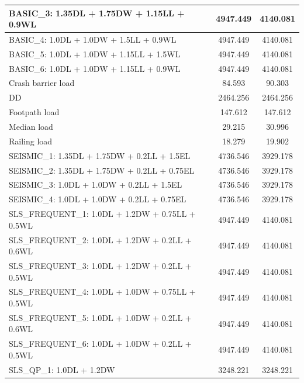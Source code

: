 \documentclass[12pt,a4paper]{report}
\newlength{\usablew}
\numberwithin{table}{chapter}
\numberwithin{figure}{chapter}
\begin{document}
\begin{longtable}{|L{\usablew\relax}|C{\usablew\relax}|C{\usablew\relax}|}
\hline
BASIC\_\allowbreak{}3:\allowbreak{} 1.35DL + 1.75DW + 1.15LL + 0.9WL & 4947.449 & 4140.081 \\
\hline
BASIC\_\allowbreak{}4:\allowbreak{} 1.0DL + 1.0DW + 1.5LL + 0.9WL & 4947.449 & 4140.081 \\
\hline
BASIC\_\allowbreak{}5:\allowbreak{} 1.0DL + 1.0DW + 1.15LL + 1.5WL & 4947.449 & 4140.081 \\
\hline
BASIC\_\allowbreak{}6:\allowbreak{} 1.0DL + 1.0DW + 1.15LL + 0.9WL & 4947.449 & 4140.081 \\
\hline
Crash barrier load & 84.593 & 90.303 \\
\hline
DD & 2464.256 & 2464.256 \\
\hline
Footpath load & 147.612 & 147.612 \\
\hline
Median load & 29.215 & 30.996 \\
\hline
Railing load & 18.279 & 19.902 \\
\hline
SEISMIC\_\allowbreak{}1:\allowbreak{} 1.35DL + 1.75DW + 0.2LL + 1.5EL & 4736.546 & 3929.178 \\
\hline
SEISMIC\_\allowbreak{}2:\allowbreak{} 1.35DL + 1.75DW + 0.2LL + 0.75EL & 4736.546 & 3929.178 \\
\hline
SEISMIC\_\allowbreak{}3:\allowbreak{} 1.0DL + 1.0DW + 0.2LL + 1.5EL & 4736.546 & 3929.178 \\
\hline
SEISMIC\_\allowbreak{}4:\allowbreak{} 1.0DL + 1.0DW + 0.2LL + 0.75EL & 4736.546 & 3929.178 \\
\hline
SLS\_\allowbreak{}FREQUENT\_\allowbreak{}1:\allowbreak{} 1.0DL + 1.2DW + 0.75LL + 0.5WL & 4947.449 & 4140.081 \\
\hline
SLS\_\allowbreak{}FREQUENT\_\allowbreak{}2:\allowbreak{} 1.0DL + 1.2DW + 0.2LL + 0.6WL & 4947.449 & 4140.081 \\
\hline
SLS\_\allowbreak{}FREQUENT\_\allowbreak{}3:\allowbreak{} 1.0DL + 1.2DW + 0.2LL + 0.5WL & 4947.449 & 4140.081 \\
\hline
SLS\_\allowbreak{}FREQUENT\_\allowbreak{}4:\allowbreak{} 1.0DL + 1.0DW + 0.75LL + 0.5WL & 4947.449 & 4140.081 \\
\hline
SLS\_\allowbreak{}FREQUENT\_\allowbreak{}5:\allowbreak{} 1.0DL + 1.0DW + 0.2LL + 0.6WL & 4947.449 & 4140.081 \\
\hline
SLS\_\allowbreak{}FREQUENT\_\allowbreak{}6:\allowbreak{} 1.0DL + 1.0DW + 0.2LL + 0.5WL & 4947.449 & 4140.081 \\
\hline
SLS\_\allowbreak{}QP\_\allowbreak{}1:\allowbreak{} 1.0DL + 1.2DW & 3248.221 & 3248.221 \\

\end{longtable}
\end{document}
